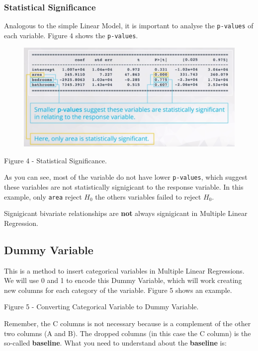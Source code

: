 \documentclass[]{book}
\begin{document}
\subsubsection{Statistical Significance}\label{statistical-significance}

Analogous to the simple Linear Model, it is important to analyse the
\texttt{p-values} of each variable. Figure 4 shows the
\texttt{p-values}.

\begin{figure}
\centering
\includegraphics{01-img/c4_l15_04.png}
\caption{}
\end{figure}

Figure 4 - Statistical Significance.

As you can see, most of the variable do not have lower
\texttt{p-values}, which suggest these variables are not statistically
signigicant to the response variable. In this example, only
\texttt{area} reject \(H_0\) the others variables failed to reject
\(H_0\).

Signigicant bivariate relationships are \textbf{not} always signigicant
in Multiple Linear Regression.

\subsection{Dummy Variable}\label{dummy-variable}

This is a method to insert categorical variables in Multiple Linear
Regressions. We will use 0 and 1 to encode this Dummy Variable, which
will work creating new columns for each category of the variable. Figure
5 shows an example.

Figure 5 - Converting Categorical Variable to Dummy Variable.

Remember, the C columns is not necessary because is a complement of the
other two columns (A and B). The dropped columns (in this case the C
column) is the so-called \textbf{baseline}. What you need to understand
about the \textbf{baseline} is:
\end{document}
